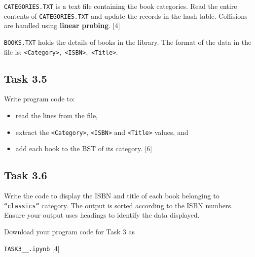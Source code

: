 \texttt{CATEGORIES.TXT} is a text file containing the book categories.
Read the entire contents of \texttt{CATEGORIES.TXT} and update the
records in the hash table. Collisions are handled using \textbf{linear
probing}. \hfill{}{[}4{]}

\texttt{BOOKS.TXT} holds the details of books in the library. The
format of the data in the file is: \texttt{<Category>},\texttt{ <ISBN>},\texttt{
<Title>}. 

\subsection*{Task 3.5 }

Write program code to: 
\begin{itemize}
\item read the lines from the file, 
\item extract the \texttt{<Category>}, \texttt{<ISBN>} and \texttt{<Title>}
values, and 
\item add each book to the BST of its category. \hfill{}{[}6{]}
\end{itemize}

\subsection*{Task 3.6 }

Write the code to display the ISBN and title of each book belonging
to \texttt{\textquotedblleft classics\textquotedblright{}} category.
The output is sorted according to the ISBN numbers. Ensure your output
uses headings to identify the data displayed. 

Download your program code for Task 3 as 

\texttt{TASK3\_<your class>\_<your name>.ipynb}\hfill{} {[}4{]}